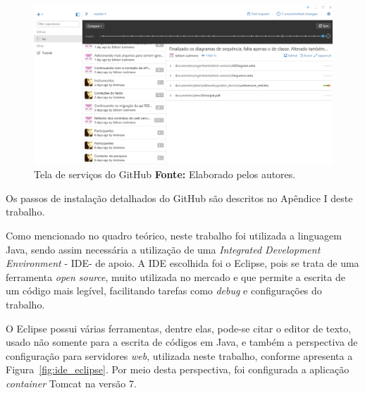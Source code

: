 
\begin{figure}[h!]
	\centerline{\includegraphics[scale=0.3]{./imagens/github.jpg}}
	\caption[Tela de serviços do GitHub ]
	{Tela de serviços do GitHub \textbf{Fonte:} Elaborado pelos autores.}
	\label{fig:github_inicio}
\end{figure}

\par Os passos de instalação detalhados do GitHub são descritos  no Apêndice I deste trabalho.

\par Como mencionado no quadro teórico, neste trabalho foi utilizada a linguagem Java, sendo assim necessária a utilização de uma \textit{Integrated Development Environment} - IDE\footnotemark[32] - de apoio. A IDE escolhida foi o Eclipse, pois se trata de uma ferramenta \textit{open source}, muito utilizada no mercado e que permite a escrita de um código mais legível, facilitando tarefas como \textit{debug} e configurações do trabalho.


\par O Eclipse possui várias ferramentas, dentre elas, pode-se citar o editor de texto, usado não somente para a escrita de códigos em Java, e também a perspectiva de configuração para servidores \textit{web}, utilizada neste trabalho, conforme apresenta a Figura~\ref{fig:ide_eclipse}. Por meio desta perspectiva, foi configurada a aplicação \textit{container} Tomcat na versão 7.

